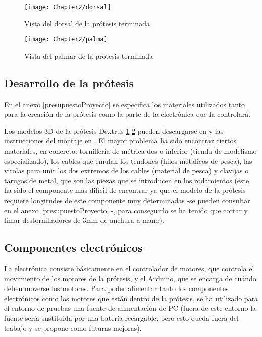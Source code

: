 \begin{figure}[htp]
  \centering
    \texttt{[image: Chapter2/dorsal]}
  \caption{Vista del dorsal de la prótesis terminada}
\label{fig:dorsal}
\end{figure}


\begin{figure}[htp]
  \centering
    \texttt{[image: Chapter2/palma]}
  \caption{Vista del palmar de la prótesis terminada}
\label{fig:palmar}
\end{figure}


\subsection{Desarrollo de la prótesis}

En el anexo \ref{presupuestoProyecto} se especifica los materiales utilizados tanto para la creación de la prótesis como la parte de la electrónica que la controlará.


Los modelos 3D de la prótesis Dextrus \ref{fig:dorsal} \ref{fig:palmar} pueden descargarse en \cite{openbionics-downloads} y las instrucciones del montaje en
\cite{dextrus-instructions}. El mayor problema ha sido encontrar ciertos materiales, en concreto: tornillería de
métrica dos o inferior (tienda de modelismo especializado), los cables que emulan los tendones (hilos métalicos de
pesca), las virolas para unir los dos extremos de los cables (material de pesca) y clavijas o tarugos de metal, que
son las piezas que se introducen en los rodamientos (este ha sido el componente más difícil de encontrar ya que
el modelo de la prótesis requiere longitudes de este componente muy determinadas -se pueden consultar en el anexo
\ref{presupuestoProyecto} -, para conseguirlo se ha tenido que cortar y limar destornilladores de 3mm de anchura a mano).







\subsection{Componentes electrónicos}

La electrónica consiste básicamente en el controlador de motores, que controla el movimiento de los motores de la prótesis, y el Arduino, que se encarga de cuándo deben moverse los motores. Para poder alimentar tanto los
componentes electrónicos como los motores que están dentro de la prótesis, se ha utilizado para el entorno de pruebas una fuente de alimentación de PC (fuera de este entorno la fuente sería sustituida por una batería
recargable, pero esto queda fuera del trabajo y se propone como futuras mejoras).

